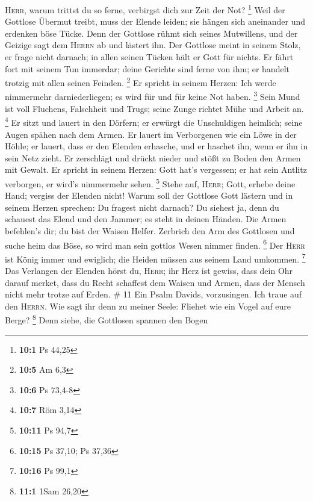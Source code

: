  \textsc{Herr}, warum trittst du so ferne, verbirgst dich
zur Zeit der Not? \footnote{\textbf{10:1} Ps 44,25}  Weil
der Gottlose Übermut treibt, muss der Elende leiden; sie hängen sich
aneinander und erdenken böse Tücke.  Denn der Gottlose
rühmt sich seines Mutwillens, und der Geizige sagt dem \textsc{Herrn} ab
und lästert ihn.  Der Gottlose meint in seinem Stolz, er
frage nicht darnach; in allen seinen Tücken hält er Gott für nichts.
 Er fährt fort mit seinem Tun immerdar; deine Gerichte
sind ferne von ihm; er handelt trotzig mit allen seinen Feinden.
\footnote{\textbf{10:5} Am 6,3}  Er spricht in seinem
Herzen: Ich werde nimmermehr darniederliegen; es wird für und für keine
Not haben. \footnote{\textbf{10:6} Ps 73,4-8}  Sein Mund
ist voll Fluchens, Falschheit und Trugs; seine Zunge richtet Mühe und
Arbeit an. \footnote{\textbf{10:7} Röm 3,14}  Er sitzt und
lauert in den Dörfern; er erwürgt die Unschuldigen heimlich; seine Augen
spähen nach dem Armen.  Er lauert im Verborgenen wie ein
Löwe in der Höhle; er lauert, dass er den Elenden erhasche, und er
haschet ihn, wenn er ihn in sein Netz zieht.  Er
zerschlägt und drückt nieder und stößt zu Boden den Armen mit Gewalt.
 Er spricht in seinem Herzen: Gott hat's vergessen; er
hat sein Antlitz verborgen, er wird's nimmermehr sehen. \footnote{\textbf{10:11}
  Ps 94,7}  Stehe auf, \textsc{Herr}; Gott, erhebe deine
Hand; vergiss der Elenden nicht!  Warum soll der Gottlose
Gott lästern und in seinem Herzen sprechen: Du fragest nicht darnach?
 Du siehest ja, denn du schauest das Elend und den
Jammer; es steht in deinen Händen. Die Armen befehlen's dir; du bist der
Waisen Helfer.  Zerbrich den Arm des Gottlosen und suche
heim das Böse, so wird man sein gottlos Wesen nimmer finden. \footnote{\textbf{10:15}
  Ps 37,10; Ps 37,36}  Der \textsc{Herr} ist König immer
und ewiglich; die Heiden müssen aus seinem Land umkommen. \footnote{\textbf{10:16}
  Ps 99,1}  Das Verlangen der Elenden hörst du,
\textsc{Herr}; ihr Herz ist gewiss, dass dein Ohr darauf merket,
 dass du Recht schaffest dem Waisen und Armen, dass der
Mensch nicht mehr trotze auf Erden. \# 11  Ein Psalm
Davids, vorzusingen. Ich traue auf den \textsc{Herrn}. Wie sagt ihr denn
zu meiner Seele: Fliehet wie ein Vogel auf eure Berge? \footnote{\textbf{11:1}
  1Sam 26,20}  Denn siehe, die Gottlosen spannen den Bogen
